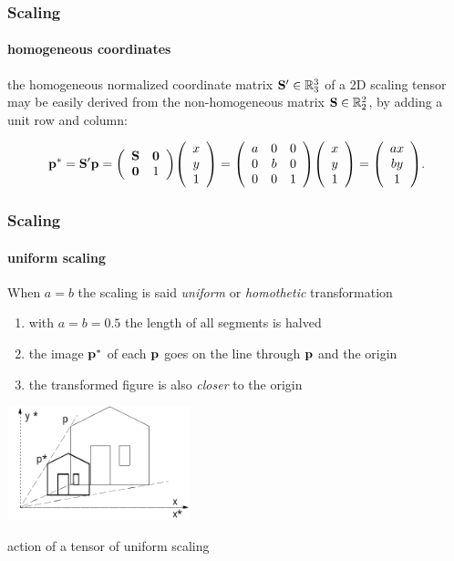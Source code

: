 \documentclass{beamer}
\begin{document}
\begin{frame}\frametitle{Scaling}
\framesubtitle{homogeneous coordinates}

\vfill

the homogeneous normalized coordinate matrix ${\bf S}'\in \mathbb{R}^3_{3}$ of a 2D scaling tensor may be easily derived  from the non-homogeneous matrix
 ${\bf S}\in \mathbb{R}^2_{2}$, by adding a unit row and column:

\vfill

\[
{\bf p}^* =
{\bf S}'{\bf p} =
{\left(\begin{array}{cccccccccccccccccccccccccccc}
{\bf S} & {\bf 0}\\
{\bf 0} &  1
\end{array}\right)}
{\left(\begin{array}{cccccccccccccccccccc}x \\ y \\ 1\end{array}\right)}
=
{\left(\begin{array}{cccccccccccccccccccccccccccc}
a & 0 & {0}\\
0 & b & {0}\\
0 &{0} &  1
\end{array}\right)}
{\left(\begin{array}{cccccccccccccccccccc}x \\ y \\ 1\end{array}\right)}
=
{\left(\begin{array}{cccccccccccccccccccc}ax \\ by \\ 1\end{array}\right)} .
\]

\vfill
\end{frame}
\begin{frame}\frametitle{Scaling}
\framesubtitle{uniform scaling}\small

\vfill

When $a=b$ the scaling is said {\emph{uniform}} or \emph{homothetic} transformation

\vfill
\begin{enumerate}
    \vfill\item with $a=b=0.5$ the length of all segments is halved
    \vfill\item\vspace{-2mm} the image ${\bf p}^{*}$ of each ${\bf p}$ goes on the line through ${\bf p}$ and the origin
    \vfill\item\vspace{-2mm} the transformed figure is also \emph{closer} to the origin
\end{enumerate}

\vfill

\begin{center}
\includegraphics[height=33mm]{images/scala2}
\end{center}

\vfill
action of a  tensor of uniform scaling

\end{frame}
\end{document}
